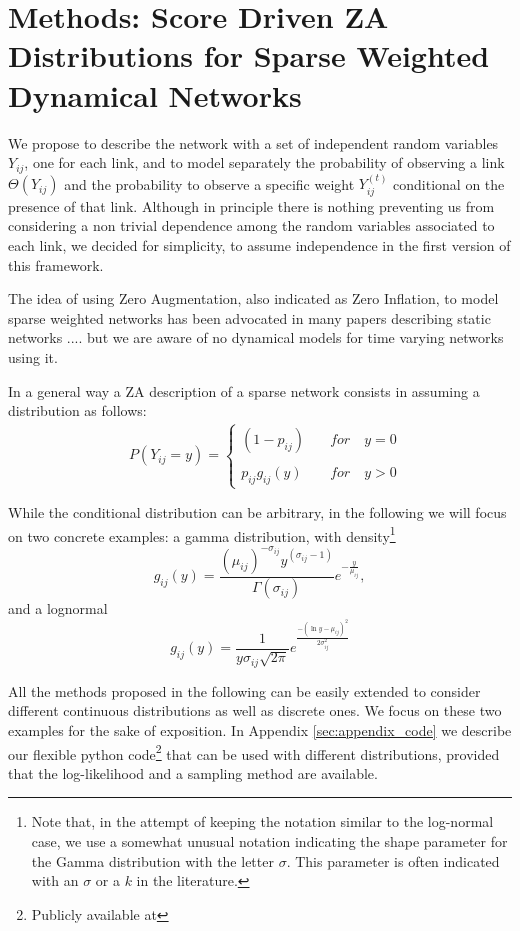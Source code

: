 \documentclass[a4paper,12pt]{article}
\newcommand{\tonde}[1]{\left(#1\right)}
\newcommand{\pt}[1]{\left(#1\right)}
\newcommand{\be}{\begin{equation}}
\newcommand{\ee}{\end{equation}}
\newcommand{\ba}{\begin{eqnarray}}
\newcommand{\ea}{\end{eqnarray}}
\newcommand{\Yijt}{{Y_{ij}^{\tonde{t}}}}
\newcommand{\Yij}{{Y_{ij}}}
\newcommand{\uij}{_{ij}}
\newcommand{\e}[1]{^{\tonde{#1}}}
\begin{document}
\section{Methods: Score Driven ZA Distributions for Sparse Weighted Dynamical Networks}
We propose to describe the network with a set of independent random variables $\Yij$, one for each link, and to model separately the probability of observing a link $\Theta\tonde{\Yij}$ and the probability to observe a specific weight $\Yijt$ conditional on the presence of that link. Although in principle there is nothing preventing us from considering a non trivial dependence among the random variables associated to each link, we decided for simplicity, to assume independence in the first version of this framework. 

The idea of using Zero Augmentation, also indicated as Zero Inflation, to model sparse weighted networks has been advocated in many papers describing static networks .... but we are aware of no dynamical models for time varying networks using it.

In a general way a ZA description of a sparse network consists in assuming a distribution as follows:
\ba\label{eq:ZeroAugWeightedNets}
&P\tonde{\Yij  = y} =  \left\lbrace\begin{array}{ll} 
	\pt{1-p\uij }   \quad &for \quad y=0 \\
	\\
	p\uij  g\uij\tonde{y} \quad &for \quad y>0 \end{array}\right.  \nonumber\\
&\nonumber\\
\ea
While the conditional distribution can be arbitrary, in the following we will focus on two concrete examples:
a gamma distribution, with density\footnote{Note that, in the attempt of keeping the notation similar to the log-normal case, we use a somewhat unusual notation indicating the shape parameter for the Gamma distribution with the letter $\sigma$. This parameter is often indicated with an $\sigma$ or a $k$ in the literature. }
\be\label{eq:gamma_distr}
g\uij\tonde{y} =  \frac{\pt{\mu_{ij}}^{-\sigma\uij} y\e{\sigma\uij-1}}{\Gamma\pt{\sigma\uij}}  e^{-{\frac{y}{\mu_{ij}}}},
\ee
and a lognormal 
\be\label{eq:lognormal_distr}
g\uij\tonde{y} = \frac{1}{y\sigma\uij {\sqrt {2\pi }}} e^{\frac{- \tonde{\ln y-\mu_{ij}}^{2}}{2\sigma^{2}\uij}}
\ee

All the methods proposed in the following can be easily extended to consider different continuous distributions as well as discrete ones. We focus on these two examples for the sake of exposition. In Appendix \ref{sec:appendix_code} we describe our flexible python code\footnote{Publicly available at  } that can be used with different distributions, provided that the log-likelihood and a sampling method are available.
\end{document}
